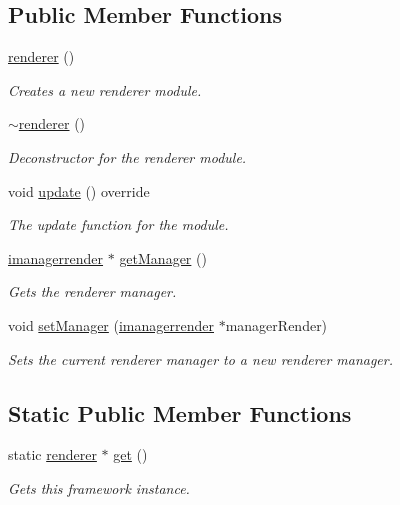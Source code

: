 \subsection*{Public Member Functions}
\begin{DoxyCompactItemize}
\item 
\hyperlink{classflounder_1_1renderer_ade56bfb3db7dca6ac41f4bc78c0ab35b}{renderer} ()
\begin{DoxyCompactList}\small\item\em Creates a new renderer module. \end{DoxyCompactList}\item 
\hyperlink{classflounder_1_1renderer_ae8ad85deab4750f01112d7f5a84e95e5}{$\sim$renderer} ()
\begin{DoxyCompactList}\small\item\em Deconstructor for the renderer module. \end{DoxyCompactList}\item 
void \hyperlink{classflounder_1_1renderer_aae85f1462ba4e9eb7899483536fdb0c5}{update} () override
\begin{DoxyCompactList}\small\item\em The update function for the module. \end{DoxyCompactList}\item 
\hyperlink{classflounder_1_1imanagerrender}{imanagerrender} $\ast$ \hyperlink{classflounder_1_1renderer_ad2d55b317665b9b64f91d03984eea226}{get\+Manager} ()
\begin{DoxyCompactList}\small\item\em Gets the renderer manager. \end{DoxyCompactList}\item 
void \hyperlink{classflounder_1_1renderer_ab4b504ed530f9a6df2327a942ccd9d70}{set\+Manager} (\hyperlink{classflounder_1_1imanagerrender}{imanagerrender} $\ast$manager\+Render)
\begin{DoxyCompactList}\small\item\em Sets the current renderer manager to a new renderer manager. \end{DoxyCompactList}\end{DoxyCompactItemize}
\subsection*{Static Public Member Functions}
\begin{DoxyCompactItemize}
\item 
static \hyperlink{classflounder_1_1renderer}{renderer} $\ast$ \hyperlink{classflounder_1_1renderer_a9dce14a77e80b7c631573cc153ac483a}{get} ()
\begin{DoxyCompactList}\small\item\em Gets this framework instance. \end{DoxyCompactList}\end{DoxyCompactItemize}
